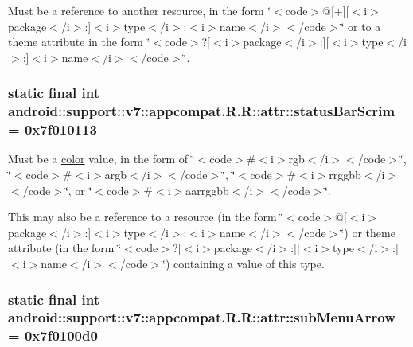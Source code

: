 Must be a reference to another resource, in the form \char`\"{}$<$code$>$@\mbox{[}+\mbox{]}\mbox{[}$<$i$>$package$<$/i$>$:\mbox{]}$<$i$>$type$<$/i$>$:$<$i$>$name$<$/i$>$$<$/code$>$\char`\"{} or to a theme attribute in the form \char`\"{}$<$code$>$?\mbox{[}$<$i$>$package$<$/i$>$:\mbox{]}\mbox{[}$<$i$>$type$<$/i$>$:\mbox{]}$<$i$>$name$<$/i$>$$<$/code$>$\char`\"{}. \hypertarget{classandroid_1_1support_1_1v7_1_1appcompat_1_1_r_1_1attr_f31078a338e56e706cda378a30ce1264}{
\subsubsection[{statusBarScrim}]{\setlength{\rightskip}{0pt plus 5cm}static final int android::support::v7::appcompat.R.R::attr::statusBarScrim = 0x7f010113}}
\label{classandroid_1_1support_1_1v7_1_1appcompat_1_1_r_1_1attr_f31078a338e56e706cda378a30ce1264}


Must be a \hyperlink{classandroid_1_1support_1_1v7_1_1appcompat_1_1_r_1_1color}{color} value, in the form of \char`\"{}$<$code$>$\#$<$i$>$rgb$<$/i$>$$<$/code$>$\char`\"{}, \char`\"{}$<$code$>$\#$<$i$>$argb$<$/i$>$$<$/code$>$\char`\"{}, \char`\"{}$<$code$>$\#$<$i$>$rrggbb$<$/i$>$$<$/code$>$\char`\"{}, or \char`\"{}$<$code$>$\#$<$i$>$aarrggbb$<$/i$>$$<$/code$>$\char`\"{}. 

This may also be a reference to a resource (in the form \char`\"{}$<$code$>$@\mbox{[}$<$i$>$package$<$/i$>$:\mbox{]}$<$i$>$type$<$/i$>$:$<$i$>$name$<$/i$>$$<$/code$>$\char`\"{}) or theme attribute (in the form \char`\"{}$<$code$>$?\mbox{[}$<$i$>$package$<$/i$>$:\mbox{]}\mbox{[}$<$i$>$type$<$/i$>$:\mbox{]}$<$i$>$name$<$/i$>$$<$/code$>$\char`\"{}) containing a value of this type. \hypertarget{classandroid_1_1support_1_1v7_1_1appcompat_1_1_r_1_1attr_00b5715e5b7e84a2dc944de3c657c398}{
\subsubsection[{subMenuArrow}]{\setlength{\rightskip}{0pt plus 5cm}static final int android::support::v7::appcompat.R.R::attr::subMenuArrow = 0x7f0100d0}}
\label{classandroid_1_1support_1_1v7_1_1appcompat_1_1_r_1_1attr_00b5715e5b7e84a2dc944de3c657c398}



